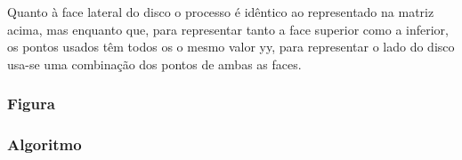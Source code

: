 Quanto à face lateral do disco o processo é idêntico ao representado na matriz acima, mas enquanto que, para representar tanto a face superior como a inferior, os pontos usados têm todos os o mesmo valor yy, para representar o lado do disco usa-se uma combinação dos pontos de ambas as faces. 





\subsubsection{Figura}

\subsubsection{Algoritmo}

